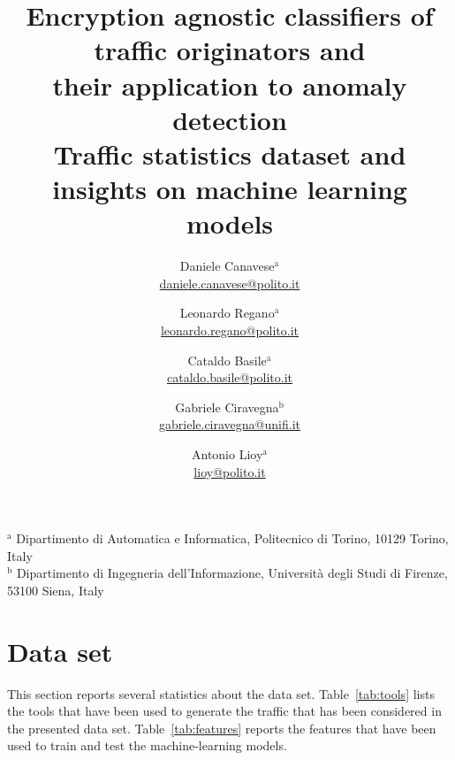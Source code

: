 \documentclass[times,review]{article}
\title{
    Encryption agnostic classifiers of traffic originators and\\their application to anomaly detection\\
    {\Large Traffic statistics dataset and insights on machine learning models}
}
\author{
    Daniele Canavese$^\text{a}$\\\href{mailto:daniele.canavese@polito.it}{daniele.canavese@polito.it}\and
    Leonardo Regano$^\text{a}$\\\href{leonardo.regano@polito.it}{leonardo.regano@polito.it}\and
    Cataldo Basile$^\text{a}$\\\href{cataldo.basile@polito.it}{cataldo.basile@polito.it}\and
    Gabriele Ciravegna$^\text{b}$\\\href{gabriele.ciravegna@unifi.it}{gabriele.ciravegna@unifi.it}\and
    Antonio Lioy$^\text{a}$\\\href{lioy@polito.it}{lioy@polito.it}
}
\date{}
\begin{document}
\maketitle
\begin{flushleft}
    $^\text{a}$ Dipartimento di Automatica e Informatica, Politecnico di Torino, 10129 Torino, Italy\\
    $^\text{b}$ Dipartimento di Ingegneria dell'Informazione, Università degli Studi di Firenze, 53100 Siena, Italy
\end{flushleft}
\newpage
\section*{Data set}

This section reports several statistics about the data set. Table~\ref{tab:tools} lists the tools that have been used to generate the traffic that has been considered in the presented
data set.
Table~\ref{tab:features} reports the features that have been used to train and test the machine-learning
models.
\end{document}
